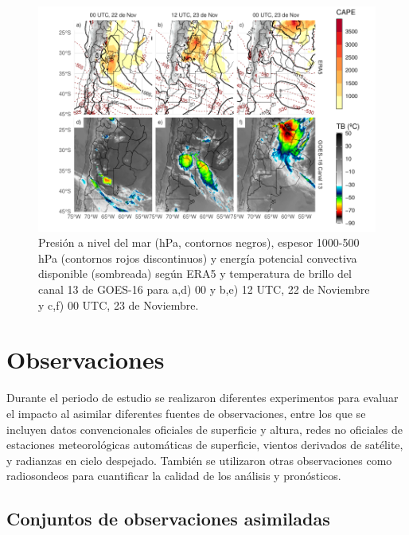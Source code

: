 \documentclass[12pt,oneside,a4paper]{reedthesis}
\begin{document}
\begin{figure}

{\centering \includegraphics{thesis_files/figure-latex/caso-1} 

}

\caption{Presión a nivel del mar (hPa, contornos negros), espesor 1000-500 hPa (contornos rojos discontinuos) y energía potencial convectiva disponible (sombreada) según ERA5 y temperatura de brillo del canal 13 de GOES-16 para a,d) 00 y b,e) 12 UTC, 22 de Noviembre y c,f) 00 UTC, 23 de Noviembre.}\label{fig:caso}
\end{figure}
\hypertarget{observaciones}{%
\section{Observaciones}\label{observaciones}}

Durante el periodo de estudio se realizaron diferentes experimentos para evaluar el impacto al asimilar diferentes fuentes de observaciones, entre los que se incluyen datos convencionales oficiales de superficie y altura, redes no oficiales de estaciones meteorológicas automáticas de superficie, vientos derivados de satélite, y radianzas en cielo despejado. También se utilizaron otras observaciones como radiosondeos para cuantificar la calidad de los análisis y pronósticos.

\hypertarget{conjuntos-de-observaciones-asimiladas}{%
\subsection{Conjuntos de observaciones asimiladas}\label{conjuntos-de-observaciones-asimiladas}}
\end{document}
